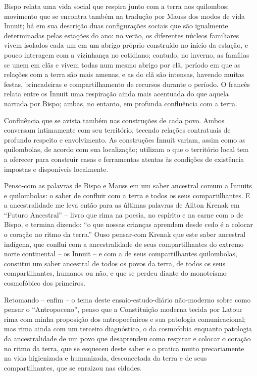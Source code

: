 Bispo relata uma vida social que respira junto com a terra nos quilombos; movimento que se encontra também na tradução por Mauss dos modos de vida Innuit; há em sua descrição duas configurações sociais que são igualmente determinadas pelas estações do ano: no verão, os diferentes núcleos familiares vivem isolados cada um em um abrigo próprio construído no início da estação, e pouco interagem com a vizinhança no cotidiano; contudo, no inverno, as famílias se unem em clãs e vivem todas num mesmo abrigo por clã, período em que as relações com a terra são mais amenas, e as do clã são intensas, havendo muitas festas, brincadeiras e compartilhamento de recursos durante o período. O francês relata entre os Innuit uma respiração ainda mais acentuada do que aquela narrada por Bispo; ambas, no entanto, em profunda confluência com a terra.

Confluência que se avista também nas construções de cada povo. Ambos conversam intimamente com seu território, tecendo relações contratuais de profundo respeito e envolvimento. As construções Innuit variam, assim como as quilombolas, de acordo com sua localização; utilizam o que o território local tem a oferecer para construir casas e ferramentas atentas às condições de existência impostas e disponíveis localmente.

Penso-com as palavras de Bispo e Mauss em um saber ancestral comum a Innuits e quilombolas: o saber de confluir com a terra e todos os seus compartilhantes. E a ancestralidade me leva então para as últimas palavras de Ailton Krenak em \enquote{Futuro Ancestral} -- livro que rima na poesia, no espírito e na carne com o de Bispo, e termina dizendo: \enquote{o que nossas crianças aprendem desde cedo é a colocar o coração no ritmo da terra.} Ouso pensar-com Krenak que este saber ancestral indígena, que conflui com a ancestralidade de seus compartilhantes do extremo norte continental -- os Innuit -- e com a de seus compartilhantes quilombolas, constitui um saber ancestral de todos os povos da terra, de todos os seus compartilhantes, humanos ou não, e que se perdeu diante do monoteísmo cosmofóbico dos primeiros.

Retomando -- enfim -- o tema deste ensaio-estudo-diário não-moderno sobre como pensar o \enquote{Antropoceno}, penso que a Constituição moderna tecida por Latour rima com minha proposição dos antropocênicos e sua patologia comunicacional; mas rima ainda com um terceiro diagnóstico, o da cosmofobia enquanto patologia da ancestralidade de um povo que desaprendeu como respirar e colocar o coração no ritmo da terra, que se esqueceu deste saber e o pratica muito precariamente na vida higienizada e humanizada, desconectada da terra e de seus compartilhantes, que se enraizou nas cidades.

